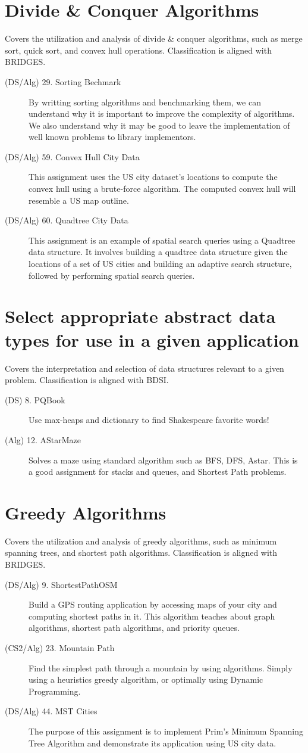 \documentclass[10pt, onecoulmn]{article}
\begin{document}
\section{Divide \& Conquer Algorithms}
Covers the utilization and analysis of divide \& conquer algorithms, such as merge sort, quick sort, and convex hull operations. Classification is aligned with BRIDGES.
\begin{description}
	\item[(DS/Alg) 29. Sorting Bechmark] By writting sorting algorithms and benchmarking them, we can understand why it is important to improve the complexity of algorithms. We also understand why it may be good to leave the implementation of well known problems to library implementors.
	\item[(DS/Alg) 59. Convex Hull City Data] This assignment uses the US city dataset's locations to compute the convex hull using a brute-force algorithm. The computed convex hull will resemble a US map outline.
	\item[(DS/Alg) 60. Quadtree City Data] This assignment is an example of spatial search queries using a Quadtree data structure. It involves building a quadtree data structure given the locations of a set of US cities and building an adaptive search structure, followed by performing spatial search queries.
\end{description}
\section{Select appropriate abstract data types for use in a given application}
Covers the interpretation and selection of data structures relevant to a given problem. Classification is aligned with BDSI.
\begin{description}
	\item[(DS) 8. PQBook] Use max-heaps and dictionary to find Shakespeare favorite words!
	\item[(Alg) 12. AStarMaze] Solves a maze using standard algorithm such as BFS, DFS, Astar. This is a good assignment for stacks and queues, and Shortest Path problems.
\end{description}
\section{Greedy Algorithms}
Covers the utilization and analysis of greedy algorithms, such as minimum spanning trees, and shortest path algorithms. Classification is aligned with BRIDGES.
\begin{description}
	\item[(DS/Alg) 9. ShortestPathOSM] Build a GPS routing application by accessing maps of your city and computing shortest paths in it. This algorithm teaches about graph algorithms, shortest path algorithms, and priority queues.
	\item[(CS2/Alg) 23. Mountain Path] Find the simplest path through a mountain by using algorithms. Simply using a heuristics greedy algorithm, or optimally using Dynamic Programming.
	\item[(DS/Alg) 44. MST Cities] The purpose of this assignment is to implement Prim's Minimum Spanning Tree Algorithm and demonstrate its application using US city data.
\end{description}
\end{document}

